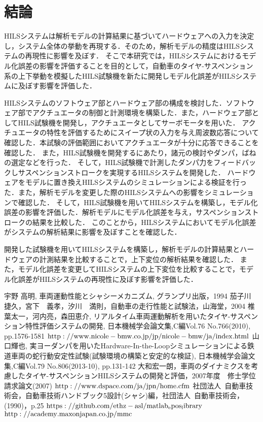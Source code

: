 \documentclass[a4paper,12pt]{article_vdlab_sotsuron}
\begin{document}
\newpage
\section{結論}
HILSシステムは解析モデルの計算結果に基づいてハードウェアへの入力を決定し，システム全体の挙動を再現する．そのため，解析モデルの精度はHILSシステムの再現性に影響を及ぼす．
そこで本研究では，HILSシステムにおけるモデル化誤差の影響を評価することを目的として，自動車のタイヤ-サスペンション系の上下挙動を模擬したHILS試験機を新たに開発しモデル化誤差がHILSシステムに及ぼす影響を評価した．

HILSシステムのソフトウェア部とハードウェア部の構成を検討した．ソフトウェア部でアクチュエータの制御と計測環境を構築した．また，ハードウェア部としてHILS試験機を開発し，アクチュエータとしてサーボモータを用いた．
アクチュエータの特性を評価するためにスイープ状の入力を与え周波数応答について確認した．本試験の評価範囲においてアクチュエータが十分に応答できることを確認した．
また，HILS試験機を開発するにあたり，諸元の検討やダンパ，ばねの選定などを行った．
そして，HILS試験機で計測したダンパ力をフィードバックしサスペンションストロークを実現するHILSシステムを開発した．
ハードウェアをモデルに置き換えHILSシステムのシミュレーションによる検証を行った．また，解析モデルを変更した際のHILSシステムへの影響をシミュレーションで確認した．
そして，HILS試験機を用いてHILSシステムを構築し，モデル化誤差の影響を評価した．解析モデルにモデル化誤差を与え，サスペンションストロークの結果を比較した．
このことから，HILSシステムにおいてモデル化誤差がシステムの解析結果に影響を及ぼすことを確認した．

開発した試験機を用いてHILSシステムを構築し，解析モデルの計算結果とハードウェアの計測結果を比較することで，上下変位の解析結果を確認した．
また，モデル化誤差を変更してHILSシステムの上下変位を比較することで，モデル化誤差がHILSシステムの再現性に及ぼす影響を評価した．

\newpage
\begin{thebibliography}{99}
宇野 高明, 車両運動性能とシャシーメカニズム, グランプリ出版，1994
茄子川　捷久，宮下　義孝，汐川　満則，自動車の走行性能と試験法，山海堂，2004
椎葉太一，河内亮，森田恵介, リアルタイム車両運動解析を用いたタイヤ-サスペンション特性評価システムの開発, 日本機械学会論文集,C編Vol.76 No.766(2010), pp.1576-1581
$\rm{http://www.nicole-bmw.co.jp/jp/nicole-bmw/ja/index.html}$
山口輝也, 実ヨーダンパを用いたHardware-In-the-Loopシミュレーションによる鉄道車両の蛇行動安定性試験(試験環境の構築と安定的な検証), 日本機械学会論文集,C編Vol.79 No.806(2013-10), pp.131-142
大和宏一朗，車両のダイナミクスを考慮したタイヤ-サスペンションHILSシステムの開発と評価，2007年度　修士学位請求論文(2007)
$\rm{http://www.dspace.com/ja/jpn/home.cfm}$
社団法人\ 自動車技術会，自動車技術ハンドブック5設計(シャシ)編，社団法人\ 自動車技術会，(1990)，p.25
$\rm{https://github.com/ethz-asl/matlab_epos_library}$
$\rm{http://academy.maxonjapan.co.jp/mmc}$
\end{thebibliography}
\end{document}
